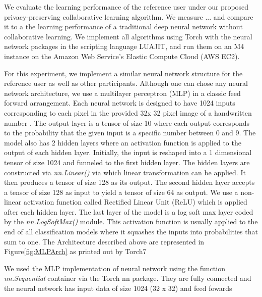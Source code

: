 \documentclass[conference]{IEEEtran}
\begin{document}
We evaluate the learning performance of the reference user under our proposed privacy-preserving collaborative learning algorithm. We
measure ... and compare it to a the learning performance of a traditional deep neural network without collaborative learning. 
We implement all algorithms using Torch with the neural network packages in the scripting language LUAJIT, and run them on an M4 instance on the Amazon Web Service's Elastic Compute Cloud (AWS EC2).

For this experiment, we implement a similar neural network structure for the reference user as well as other participants. Although one can chose any neural network architecture, we use a multilayer perceptron (MLP) in a classic feed forward arrangement. 
Each neural network is designed to have 1024 inputs
corresponding to each pixel in the provided 32x 32 pixel image of a handwritten number \cite{deng2012mnist}. The output layer is a
tensor of size 10 where each output corresponds to the probability that the given input is a specific number between 0 and 9. The model
also has 2 hidden layers where an activation function is applied to the output of each hidden layer.
Initially, the input is reshaped into a 1 dimensional tensor of size 1024 and funneled to the first hidden layer. The hidden layers are constructed via \textit{nn.Linear()} via which linear transformation can be applied. It then produces a tensor of size 128 as its output. The second hidden layer accepts a tensor of size 128 as input to yield a tensor of size 64 as output. We use a non-linear activation function called Rectified Linear Unit (ReLU) which is applied after each hidden layer. The last layer of the model is a log soft max layer coded by the \textit{nn.LogSoftMax()} module.  This activation function is usually applied to the end of all classification models where it squashes the inputs into probabilities that sum to one.
The Architecture described above are represented in Figure\ref{fig:MLPArch} as printed out by Torch7



We used the MLP implementation of neural network using the function \textit{nn.Sequential} container via the Torch nn package. They are
fully connected and the neural network has input data of size 1024 (32 x 32) and feed fowards
\end{document}
